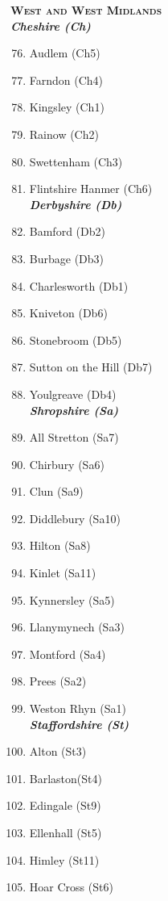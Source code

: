 \begin{refsection}
	\begin{multicols}{2}
	\textbf{\textsc{West and West Midlands}}\\
	\emph{\textbf{Cheshire (Ch)}}
	 \begin{enumerate}\setcounter{enumi}{75}
		\item Audlem (Ch5)
		\item Farndon (Ch4)
		\item Kingsley (Ch1)
		\item Rainow (Ch2)
		\item Swettenham (Ch3)
		\item Flintshire Hanmer (Ch6)\\
		\emph{\textbf{Derbyshire (Db)}}
		\item Bamford (Db2)
		\item Burbage (Db3)
		\item Charlesworth (Db1)
		\item Kniveton (Db6)
		\item Stonebroom (Db5)
		\item Sutton on the Hill (Db7)
		\item Youlgreave (Db4)\\
		\emph{\textbf{Shropshire (Sa)}}
		\item All Stretton (Sa7)
		\item Chirbury (Sa6)
		\item Clun (Sa9)
		\item Diddlebury (Sa10)
		\item Hilton (Sa8) 
		\item Kinlet (Sa11)
		\item Kynnersley (Sa5)
		\item Llanymynech (Sa3)
		\item Montford (Sa4)
		\item Prees (Sa2)
		\item Weston Rhyn (Sa1)\\
		\emph{\textbf{Staffordshire (St)}}
		\item Alton (St3)
		\item Barlaston(St4)
		\item Edingale (St9)
		\item Ellenhall (St5)
		\item Himley (St11)
		\item Hoar Cross (St6)

\end{enumerate}
\end{multicols}
\end{refsection}
